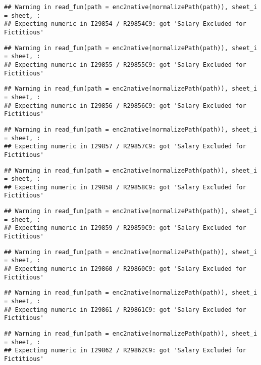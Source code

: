 \documentclass[
]{article}
\begin{document}
\begin{verbatim}
## Warning in read_fun(path = enc2native(normalizePath(path)), sheet_i = sheet, :
## Expecting numeric in I29854 / R29854C9: got 'Salary Excluded for Fictitious'
\end{verbatim}

\begin{verbatim}
## Warning in read_fun(path = enc2native(normalizePath(path)), sheet_i = sheet, :
## Expecting numeric in I29855 / R29855C9: got 'Salary Excluded for Fictitious'
\end{verbatim}

\begin{verbatim}
## Warning in read_fun(path = enc2native(normalizePath(path)), sheet_i = sheet, :
## Expecting numeric in I29856 / R29856C9: got 'Salary Excluded for Fictitious'
\end{verbatim}

\begin{verbatim}
## Warning in read_fun(path = enc2native(normalizePath(path)), sheet_i = sheet, :
## Expecting numeric in I29857 / R29857C9: got 'Salary Excluded for Fictitious'
\end{verbatim}

\begin{verbatim}
## Warning in read_fun(path = enc2native(normalizePath(path)), sheet_i = sheet, :
## Expecting numeric in I29858 / R29858C9: got 'Salary Excluded for Fictitious'
\end{verbatim}

\begin{verbatim}
## Warning in read_fun(path = enc2native(normalizePath(path)), sheet_i = sheet, :
## Expecting numeric in I29859 / R29859C9: got 'Salary Excluded for Fictitious'
\end{verbatim}

\begin{verbatim}
## Warning in read_fun(path = enc2native(normalizePath(path)), sheet_i = sheet, :
## Expecting numeric in I29860 / R29860C9: got 'Salary Excluded for Fictitious'
\end{verbatim}

\begin{verbatim}
## Warning in read_fun(path = enc2native(normalizePath(path)), sheet_i = sheet, :
## Expecting numeric in I29861 / R29861C9: got 'Salary Excluded for Fictitious'
\end{verbatim}

\begin{verbatim}
## Warning in read_fun(path = enc2native(normalizePath(path)), sheet_i = sheet, :
## Expecting numeric in I29862 / R29862C9: got 'Salary Excluded for Fictitious'
\end{verbatim}
\end{document}

